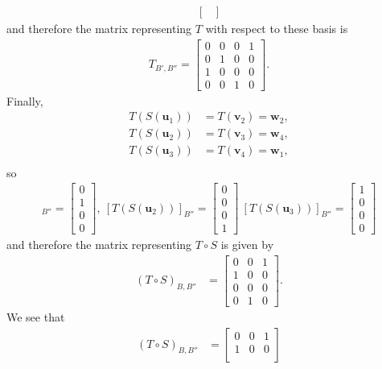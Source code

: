 \documentclass[12pt,letterpaper,reqno]{article}
\numberwithin{equation}{section}
\newcommand{\bv}{\mathbf{v}}
\newcommand{\bw}{\mathbf{w}}
\newcommand{\bu}{\mathbf{u}}
\begin{document}
\begin{example}
\begin{align*}
\begin{bmatrix}
	\end{bmatrix}
\end{align*}
and therefore the matrix representing $T$ with respect to these basis is 
\begin{align*}
	T_{B',B''}=\begin{bmatrix}
		0 & 0 & 0 & 1 \\
		0 & 1 & 0 & 0 \\
		1 & 0 & 0 & 0 \\
		0 & 0 & 1 & 0
	\end{bmatrix}.
\end{align*}
Finally,
\begin{align*}
	T(S(\bu_1))&=T(\bv_2)=\bw_2, \\
	T(S(\bu_2))&=T(\bv_3)=\bw_4, \\
	T(S(\bu_3))&=T(\bv_4)=\bw_1, \\
\end{align*}
so
\begin{align*}
	[T(S(\bu_1))]_{B''}=\begin{bmatrix}
		0 \\ 1 \\ 0 \\ 0
	\end{bmatrix}, \ [T(S(\bu_2))]_{B''}=\begin{bmatrix}
		0 \\ 0 \\ 0 \\ 1 
	\end{bmatrix} \ [T(S(\bu_3))]_{B''}=\begin{bmatrix}
		1 \\ 0 \\ 0 \\ 0
	\end{bmatrix}
\end{align*}
and therefore the matrix representing $T \circ S$ is given by
\begin{align*}
	(T \circ S)_{B,B''}&=\begin{bmatrix}
		0 & 0 & 1 \\
		1 & 0 & 0 \\
		0 & 0 & 0 \\
		0 & 1 & 0
	\end{bmatrix}.
\end{align*}
We see that	
\begin{align*}
	(T \circ S)_{B,B''}&=\begin{bmatrix}
		0 & 0 & 1 \\
		1 & 0 & 0 \\

\end{bmatrix}
\end{align*}
\end{example}
\end{document}
